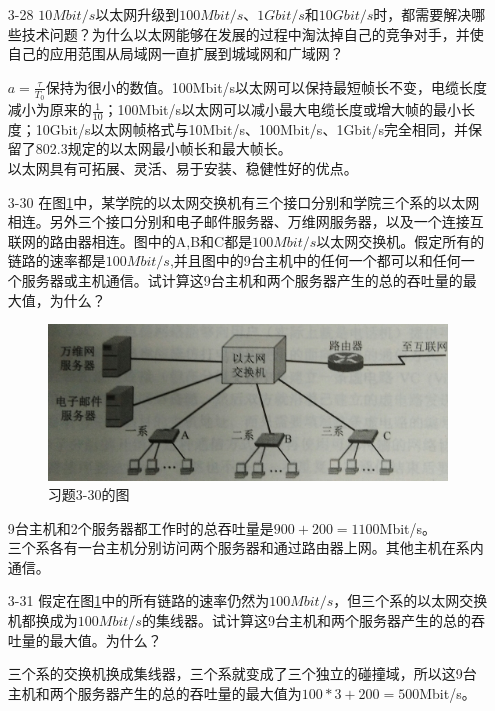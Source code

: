 \documentclass[a4paper,UTF8]{article}
\begin{document}
\begin{enumerate}
\item[3-28] $10Mbit/s$以太网升级到$100Mbit/s$、$1Gbit/s$和$10Gbit/s$时，都需要解决哪些技术问题？为什么以太网能够在发展的过程中淘汰掉自己的竞争对手，并使自己的应用范围从局域网一直扩展到城域网和广域网？
\begin{solution}
    $a=\frac{\tau}{T_0}$保持为很小的数值。100Mbit/s以太网可以保持最短帧长不变，电缆长度减小为原来的$\frac{1}{10}$；100Mbit/s以太网可以减小最大电缆长度或增大帧的最小长度；10Gbit/s以太网帧格式与10Mbit/s、100Mbit/s、1Gbit/s完全相同，并保留了802.3规定的以太网最小帧长和最大帧长。\\
    以太网具有可拓展、灵活、易于安装、稳健性好的优点。
\end{solution}

\item[3-30] 在图\ref{img:3-30}中，某学院的以太网交换机有三个接口分别和学院三个系的以太网相连。另外三个接口分别和电子邮件服务器、万维网服务器，以及一个连接互联网的路由器相连。图中的A,B和C都是$100Mbit/s$以太网交换机。假定所有的链路的速率都是$100Mbit/s$,并且图中的9台主机中的任何一个都可以和任何一个服务器或主机通信。试计算这9台主机和两个服务器产生的总的吞吐量的最大值，为什么？ 
\begin{figure}[htbp]
    \centering
    \includegraphics[scale=0.10]{3-30}
    \caption{习题3-30的图}
    \label{img:3-30}
\end{figure}
\begin{solution}
    9台主机和2个服务器都工作时的总吞吐量是$900+200=1100$Mbit/s。\\
    三个系各有一台主机分别访问两个服务器和通过路由器上网。其他主机在系内通信。
\end{solution}

\item[3-31] 假定在图\ref{img:3-30}中的所有链路的速率仍然为$100Mbit/s$，但三个系的以太网交换机都换成为$100Mbit/s$的集线器。试计算这9台主机和两个服务器产生的总的吞吐量的最大值。为什么？
\begin{solution}
    三个系的交换机换成集线器，三个系就变成了三个独立的碰撞域，所以这9台主机和两个服务器产生的总的吞吐量的最大值为$100*3+200=500$Mbit/s。
\end{solution}


\end{enumerate}
\end{document}
